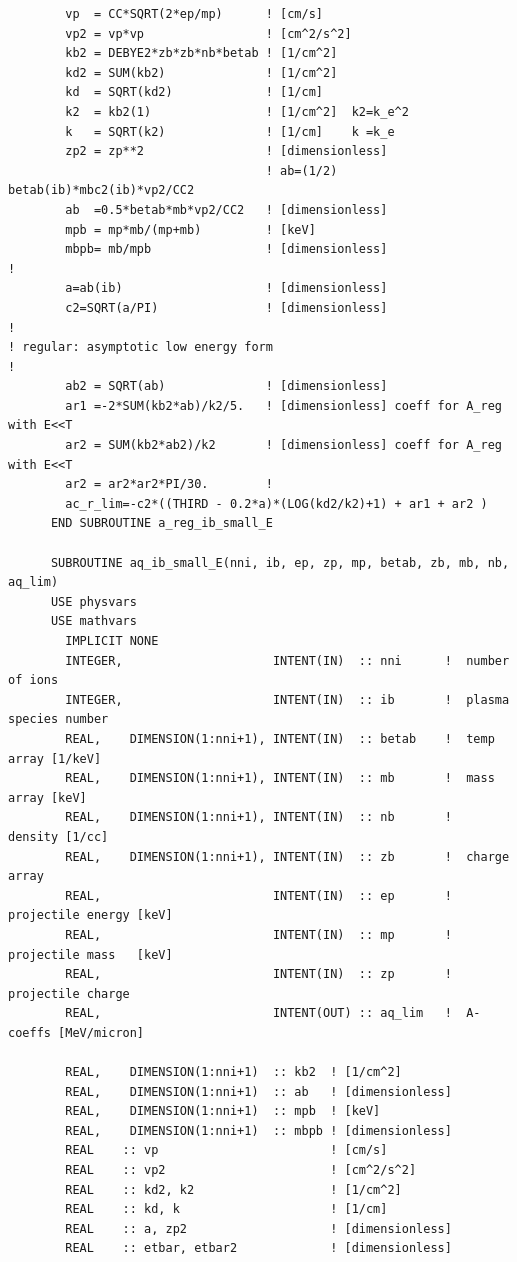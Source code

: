 \documentclass[preprint,12pt,eqsecnum,nofootinbib,amsmath,amssymb]{revtex4}
\begin{document}
{\begin{verbatim}
        vp  = CC*SQRT(2*ep/mp)      ! [cm/s]
        vp2 = vp*vp                 ! [cm^2/s^2]
        kb2 = DEBYE2*zb*zb*nb*betab ! [1/cm^2]
        kd2 = SUM(kb2)              ! [1/cm^2]
        kd  = SQRT(kd2)             ! [1/cm]
        k2  = kb2(1)                ! [1/cm^2]  k2=k_e^2
        k   = SQRT(k2)              ! [1/cm]    k =k_e
        zp2 = zp**2                 ! [dimensionless]
                                    ! ab=(1/2) betab(ib)*mbc2(ib)*vp2/CC2
        ab  =0.5*betab*mb*vp2/CC2   ! [dimensionless] 
        mpb = mp*mb/(mp+mb)         ! [keV]
        mbpb= mb/mpb                ! [dimensionless]
!
        a=ab(ib)                    ! [dimensionless] 
        c2=SQRT(a/PI)               ! [dimensionless]
!
! regular: asymptotic low energy form
!
        ab2 = SQRT(ab)              ! [dimensionless]
        ar1 =-2*SUM(kb2*ab)/k2/5.   ! [dimensionless] coeff for A_reg with E<<T
        ar2 = SUM(kb2*ab2)/k2       ! [dimensionless] coeff for A_reg with E<<T
        ar2 = ar2*ar2*PI/30.        !
        ac_r_lim=-c2*((THIRD - 0.2*a)*(LOG(kd2/k2)+1) + ar1 + ar2 )
      END SUBROUTINE a_reg_ib_small_E

      SUBROUTINE aq_ib_small_E(nni, ib, ep, zp, mp, betab, zb, mb, nb, aq_lim)
      USE physvars
      USE mathvars      
        IMPLICIT NONE
        INTEGER,                     INTENT(IN)  :: nni      !  number of ions
        INTEGER,                     INTENT(IN)  :: ib       !  plasma species number
        REAL,    DIMENSION(1:nni+1), INTENT(IN)  :: betab    !  temp array [1/keV]
        REAL,    DIMENSION(1:nni+1), INTENT(IN)  :: mb       !  mass array [keV]
        REAL,    DIMENSION(1:nni+1), INTENT(IN)  :: nb       !  density [1/cc]
        REAL,    DIMENSION(1:nni+1), INTENT(IN)  :: zb       !  charge array
        REAL,                        INTENT(IN)  :: ep       !  projectile energy [keV]
        REAL,                        INTENT(IN)  :: mp       !  projectile mass   [keV]
        REAL,                        INTENT(IN)  :: zp       !  projectile charge
        REAL,                        INTENT(OUT) :: aq_lim   !  A-coeffs [MeV/micron]

        REAL,    DIMENSION(1:nni+1)  :: kb2  ! [1/cm^2]
        REAL,    DIMENSION(1:nni+1)  :: ab   ! [dimensionless]
        REAL,    DIMENSION(1:nni+1)  :: mpb  ! [keV]
        REAL,    DIMENSION(1:nni+1)  :: mbpb ! [dimensionless]
        REAL    :: vp                        ! [cm/s]
        REAL    :: vp2                       ! [cm^2/s^2]
        REAL    :: kd2, k2                   ! [1/cm^2]
        REAL    :: kd, k                     ! [1/cm]
        REAL    :: a, zp2                    ! [dimensionless]
        REAL    :: etbar, etbar2             ! [dimensionless]


\end{verbatim}}
\end{document}
